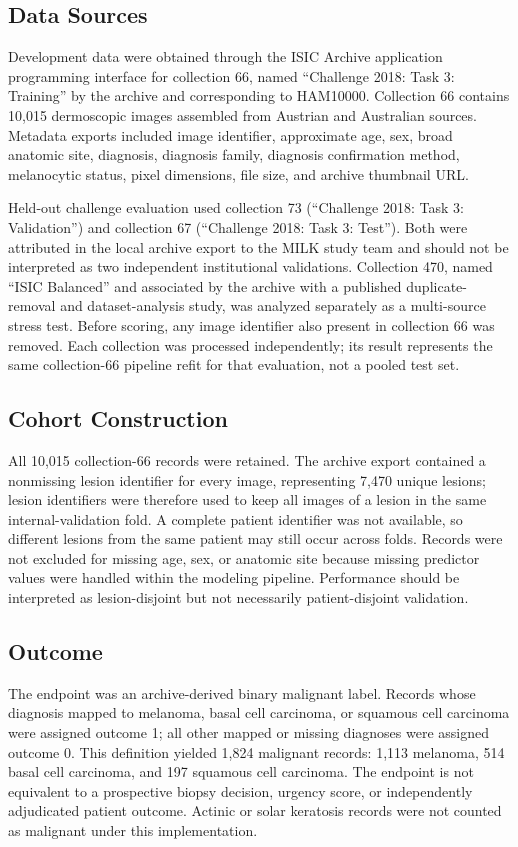 \documentclass[11pt]{article}
\begin{document}
\subsection{Data Sources}
Development data were obtained through the ISIC Archive application programming interface for collection 66, named ``Challenge 2018: Task 3: Training'' by the archive and corresponding to HAM10000. Collection 66 contains 10,015 dermoscopic images assembled from Austrian and Australian sources.\cite{tschandl2018,codella2019} Metadata exports included image identifier, approximate age, sex, broad anatomic site, diagnosis, diagnosis family, diagnosis confirmation method, melanocytic status, pixel dimensions, file size, and archive thumbnail URL.

Held-out challenge evaluation used collection 73 (``Challenge 2018: Task 3: Validation'') and collection 67 (``Challenge 2018: Task 3: Test''). Both were attributed in the local archive export to the MILK study team and should not be interpreted as two independent institutional validations. Collection 470, named ``ISIC Balanced'' and associated by the archive with a published duplicate-removal and dataset-analysis study,\cite{cassidy2022} was analyzed separately as a multi-source stress test. Before scoring, any image identifier also present in collection 66 was removed. Each collection was processed independently; its result represents the same collection-66 pipeline refit for that evaluation, not a pooled test set.

\subsection{Cohort Construction}
All 10,015 collection-66 records were retained. The archive export contained a nonmissing lesion identifier for every image, representing 7,470 unique lesions; lesion identifiers were therefore used to keep all images of a lesion in the same internal-validation fold. A complete patient identifier was not available, so different lesions from the same patient may still occur across folds. Records were not excluded for missing age, sex, or anatomic site because missing predictor values were handled within the modeling pipeline. Performance should be interpreted as lesion-disjoint but not necessarily patient-disjoint validation.

\subsection{Outcome}
The endpoint was an archive-derived binary malignant label. Records whose diagnosis mapped to melanoma, basal cell carcinoma, or squamous cell carcinoma were assigned outcome 1; all other mapped or missing diagnoses were assigned outcome 0. This definition yielded 1,824 malignant records: 1,113 melanoma, 514 basal cell carcinoma, and 197 squamous cell carcinoma. The endpoint is not equivalent to a prospective biopsy decision, urgency score, or independently adjudicated patient outcome. Actinic or solar keratosis records were not counted as malignant under this implementation.
\end{document}
